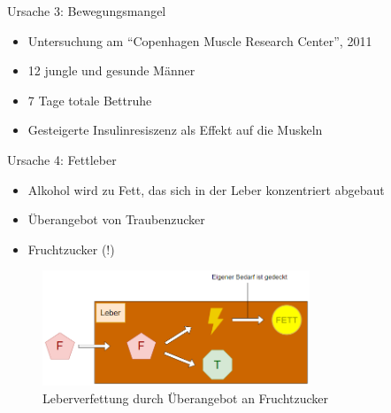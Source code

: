 \documentclass[xcolor=dvipsnames]{beamer}
\begin{document}
\begin{frame}[allowframebreaks]
        \framebreak

        \begin{block}{Ursache 3: Bewegungsmangel}
            \begin{itemize}
                \setlength\itemsep{1em}
                \item Untersuchung am "`Copenhagen Muscle Research Center"', 2011
                \item 12 jungle und gesunde Männer
                \item 7 Tage totale Bettruhe
                \item Gesteigerte Insulinresiszenz als Effekt auf die Muskeln
            \end{itemize}
        \end{block}

        \framebreak

        \begin{block}{Ursache 4: Fettleber}
            \begin{itemize}
                \item Alkohol wird zu Fett, das sich in der Leber konzentriert abgebaut
                \item Überangebot von Traubenzucker
                \item Fruchtzucker (!)
            \end{itemize}
        \end{block}

        \begin{figure}
            \centering
            \includegraphics[width=8cm]{../images/ursache_3.png}
            \caption{Leberverfettung durch Überangebot an Fruchtzucker}
        \end{figure}
    \end{frame}
\end{document}
